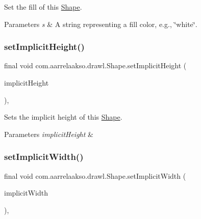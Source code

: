 Set the fill of this \hyperlink{classcom_1_1aarrelaakso_1_1drawl_1_1_shape}{Shape}. 


\begin{DoxyParams}{Parameters}
{\em s} & A string representing a fill color, e.\+g., \char`\"{}white\char`\"{}. \\
\hline
\end{DoxyParams}
\mbox{\label{classcom_1_1aarrelaakso_1_1drawl_1_1_shape_a01a28173688c7c955b0c7558ac3ff5df}} 
\subsubsection{\texorpdfstring{set\+Implicit\+Height()}{setImplicitHeight()}}
{\footnotesize\ttfamily final void com.\+aarrelaakso.\+drawl.\+Shape.\+set\+Implicit\+Height (\begin{DoxyParamCaption}\item[{@Not\+Null \hyperlink{classcom_1_1aarrelaakso_1_1drawl_1_1_drawl_number}{Drawl\+Number}}]{implicit\+Height }\end{DoxyParamCaption})\hspace{0.3cm}{\ttfamily [protected]}, {\ttfamily [inherited]}}



Sets the implicit height of this \hyperlink{classcom_1_1aarrelaakso_1_1drawl_1_1_shape}{Shape}. 


\begin{DoxyParams}{Parameters}
{\em implicit\+Height} & \\
\hline
\end{DoxyParams}
\mbox{\label{classcom_1_1aarrelaakso_1_1drawl_1_1_shape_ac513970aed7ea7faa1de7efa35d7d068}} 
\subsubsection{\texorpdfstring{set\+Implicit\+Width()}{setImplicitWidth()}}
{\footnotesize\ttfamily final void com.\+aarrelaakso.\+drawl.\+Shape.\+set\+Implicit\+Width (\begin{DoxyParamCaption}\item[{@Not\+Null \hyperlink{classcom_1_1aarrelaakso_1_1drawl_1_1_drawl_number}{Drawl\+Number}}]{implicit\+Width }\end{DoxyParamCaption})\hspace{0.3cm}{\ttfamily [protected]}, {\ttfamily [inherited]}}



